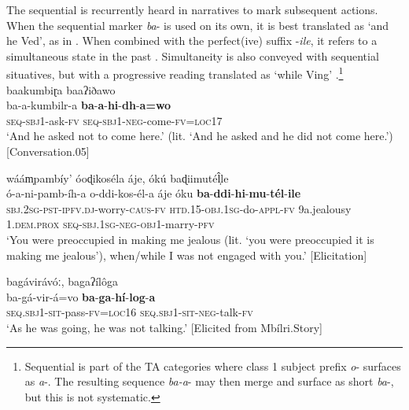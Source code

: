 \documentclass[output=paper,colorlinks=true, citecolor=brown,draftmode]{langscibook}
\begin{document}
The sequential is recurrently heard in narratives to mark subsequent actions. When the sequential marker \textit{ba}{}- is used on its own, it is best translated as ‘and he Ved’, as in . When combined with the perfect(ive) suffix -\textit{ile}, it refers to a simultaneous state in the past . Simultaneity is also conveyed with sequential situatives, but with a progressive reading translated as ‘while Ving’ .\footnote{Sequential is part of the TA categories where class 1 subject prefix \textit{o}{}- surfaces as \textit{a}{}-. The resulting sequence \textit{ba-a}{}- may then merge and surface as short \textit{ba}{}-, but this is not systematic.} 
\newpage
\ea\label{ex:cuw:43} baakumbiɽa baaʔiðawo \\ 
    \gll ba-a-kumbilr-a \textbf{ba}{}-\textbf{a}{}-\textbf{hi}{}-\textbf{dh}{}-\textbf{a=wo} \\
        \textsc{seq-sbj1-}ask-\textsc{fv} \textsc{seq-sbj1-neg}{}-come-\textsc{fv=loc17}  \\
    \glt ‘And he asked not to come here.’ (lit. ‘And he asked and he did not come here.’) [Conversation.05]
\z 

\ea\label{ex:cuw:44} wáám̩pambíy’ óoɖikoséla áje, ókú baɖiimuté\^{l}̩le\\ 
    \gll  ó-a-ni-pamb-íh-a o-ddi-kos-él-a áje óku \textbf{ba}{}-\textbf{ddi}{}-\textbf{hi}{}-\textbf{mu}{}-\textbf{tél}{}-\textbf{ile} \\
        \textsc{sbj.2sg-pst-ipfv.dj}{}-worry-\textsc{caus-fv} \textsc{htd.15-obj.1sg}{}-do-\textsc{appl-fv} 9a.jealousy 1.\textsc{dem.prox} \textsc{seq-sbj.1sg-neg}{}-\textsc{obj}1-marry-\textsc{pfv}  \\
    \glt ‘You were preoccupied in making me jealous (lit. ‘you were preoccupied it is making me jealous’), when/while I was not engaged with you.’ [Elicitation]
\z 

\ea\label{ex:cuw:45} bagávirávóː, bagaʔílôga \\ 
    \gll ba-gá-vir-á=vo \textbf{ba}{}-\textbf{ga}{}-\textbf{hí}{}-\textbf{log}{}-\textbf{a}  \\
        \textsc{seq.sbj1}-\textsc{sit}{}-pass-\textsc{fv}=\textsc{loc16} \textsc{seq.sbj1}-\textsc{sit-neg}{}-talk-\textsc{fv}  \\
    \glt ‘As he was going, he was not talking.’ [Elicited from Mbílri.Story]
\z 
\end{document}
